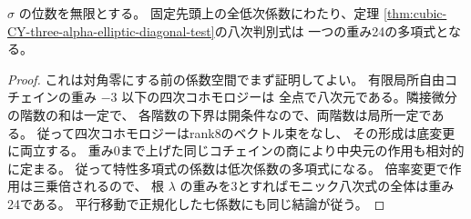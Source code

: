 \begin{proposition}\label{prop:cubic-CY-three-alpha-elliptic-discriminant-weight}
$\sigma$ の位数を無限とする。
固定先頭上の全低次係数にわたり、定理
\ref{thm:cubic-CY-three-alpha-elliptic-diagonal-test}の八次判別式は
一つの重み24の多項式となる。
\end{proposition}
\begin{proof}
これは対角零にする前の係数空間でまず証明してよい。
有限局所自由コチェインの重み $-3$ 以下の四次コホモロジーは
全点で八次元である。隣接微分の階数の和は一定で、
各階数の下界は開条件なので、両階数は局所一定である。
従って四次コホモロジーはrank8のベクトル束をなし、
その形成は底変更に両立する。
重み0まで上げた同じコチェインの商により中央元の作用も相対的に定まる。
従って特性多項式の係数は低次係数の多項式になる。
倍率変更で作用は三乗倍されるので、
根 $\lambda$ の重みを3とすればモニック八次式の全体は重み24である。
平行移動で正規化した七係数にも同じ結論が従う。
\end{proof}

